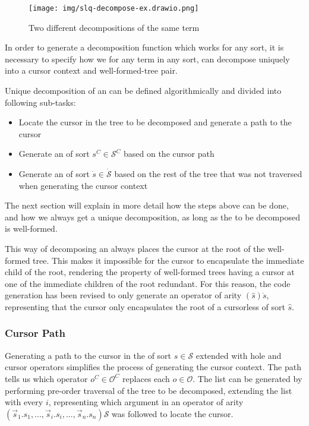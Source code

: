 \documentclass[sigplan,screen]{acmart}
\begin{document}
\begin{figure}%
  \centering
  \texttt{[image: img/slq-decompose-ex.drawio.png]}
  \caption{Two different decompositions of the same term}
  \label{fig:sql-decomp-ex}
\end{figure}

In order to generate a decomposition function which works for any sort,
it is necessary to specify how we for any term in any sort,
can decompose uniquely into a cursor context and well-formed-tree pair.

Unique decomposition of an \abt can be defined algorithmically and divided
into following sub-tasks:
\begin{itemize}
  \item Locate the cursor in the tree to be decomposed and generate a path to the cursor
  \item Generate an \abt of sort $s^C \in \mathcal{S}^C$ based on the cursor path
  \item Generate an \abt of sort $\dot{s} \in \dot{\mathcal{S}}$
        based on the rest of the tree that was not traversed
        when generating the cursor context
\end{itemize}

The next section will explain in more detail how the steps above can be done,
and how we always get a unique decomposition, as long as the \abt to be decomposed is well-formed.

This way of decomposing an \abt always places the cursor at the root of the
well-formed tree. This makes it impossible for the cursor to encapsulate the immediate
child of the root, rendering the property of well-formed trees having a cursor at one of the immediate children of the root redundant. For this reason, the code generation
has been revised to only generate an operator of arity $(\hat{s})\dot{s}$,
representing that the cursor only encapsulates the root of a cursorless \abt
of sort $\hat{s}$.

\subsubsection{Cursor Path}

Generating a path to the cursor in the \abt of sort $s \in \mathcal{S}$ extended with
hole and cursor operators simplifies the process of generating the cursor context. The path tells us
which operator $o^C \in \mathcal{O}^C$ replaces each $o \in \mathcal{O}$.
The list can be generated by performing pre-order traversal of the tree to be decomposed,
extending the list with every $i$, representing which argument in an operator of
arity $(\vec{s}_1.s_1, ... , \vec{s}_i.s_i, ..., \vec{s}_n.s_n)\mathcal{S}$ was
followed to locate the cursor.
\end{document}
